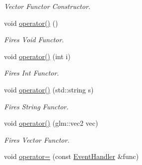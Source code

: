 \begin{DoxyCompactItemize}
\begin{DoxyCompactList}\small\item\em Vector Functor Constructor. \end{DoxyCompactList}\item 
\hypertarget{class_event_handler_a45684d26fef24278c15a21894e64af18}{void \hyperlink{class_event_handler_a45684d26fef24278c15a21894e64af18}{operator()} ()}\label{class_event_handler_a45684d26fef24278c15a21894e64af18}

\begin{DoxyCompactList}\small\item\em Fires Void Functor. \end{DoxyCompactList}\item 
\hypertarget{class_event_handler_aaf68fb8408f4d2740d0086de802ac69e}{void \hyperlink{class_event_handler_aaf68fb8408f4d2740d0086de802ac69e}{operator()} (int i)}\label{class_event_handler_aaf68fb8408f4d2740d0086de802ac69e}

\begin{DoxyCompactList}\small\item\em Fires Int Functor. \end{DoxyCompactList}\item 
\hypertarget{class_event_handler_a4083d0f599c7558894810635e563cd8e}{void \hyperlink{class_event_handler_a4083d0f599c7558894810635e563cd8e}{operator()} (std\+::string s)}\label{class_event_handler_a4083d0f599c7558894810635e563cd8e}

\begin{DoxyCompactList}\small\item\em Fires String Functor. \end{DoxyCompactList}\item 
\hypertarget{class_event_handler_a7c704b798b8b57610fbf194899915b28}{void \hyperlink{class_event_handler_a7c704b798b8b57610fbf194899915b28}{operator()} (glm\+::vec2 vec)}\label{class_event_handler_a7c704b798b8b57610fbf194899915b28}

\begin{DoxyCompactList}\small\item\em Fires Vector Functor. \end{DoxyCompactList}\item 
\hypertarget{class_event_handler_a5a44f133d79f06b728b83ce005d88644}{void \hyperlink{class_event_handler_a5a44f133d79f06b728b83ce005d88644}{operator=} (const \hyperlink{class_event_handler}{Event\+Handler} \&func)}\label{class_event_handler_a5a44f133d79f06b728b83ce005d88644}


\end{DoxyCompactItemize}
